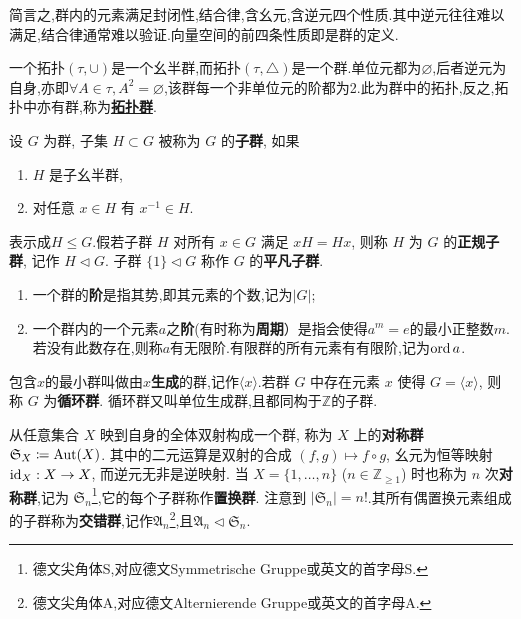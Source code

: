 简言之,群内的元素满足封闭性,结合律,含幺元,含逆元四个性质.其中逆元往往难以满足,结合律通常难以验证.向量空间的前四条性质即是群的定义.
\begin{example}
	一个拓扑$(\tau,\cup)$是一个幺半群,而拓扑$(\tau,\triangle)$是一个群.单位元都为$\varnothing$,后者逆元为自身,亦即$\forall A\in\tau,A^2=\varnothing$,该群每一个非单位元的阶都为2.此为群中的拓扑,反之,拓扑中亦有群,称为\href{https://en.wikipedia.org/wiki/Topological_group}{\textbf{拓扑群}}.
\end{example}
\begin{definition}
	设 $G$ 为群, 子集 $H \subset G$ 被称为 $G$ 的\textbf{子群}, 如果
	\begin{enumerate}
		\item $H$ 是子幺半群,
		\item 对任意 $x \in H$ 有 $x^{-1} \in H$.
	\end{enumerate}
	表示成$H\leqslant G$.假若子群 $H$ 对所有 $x \in G$ 满足 $xH = Hx$, 则称 $H$ 为 $G$ 的\textbf{正规子群}, 记作 $H \lhd G$. 子群 $\{1\} \lhd G$ 称作 $G$ 的\textbf{平凡子群}.
\end{definition}
\begin{definition}
	\begin{enumerate}
		\item 一个群的\textbf{阶}是指其势,即其元素的个数,记为$|G|$;
		\item 一个群内的一个元素$a$之\textbf{阶}(有时称为\textbf{周期}）是指会使得$a^m = e$的最小正整数$m$.若没有此数存在,则称$a$有无限阶.有限群的所有元素有有限阶,记为$\operatorname{\mathrm{ord}} a$.
	\end{enumerate}
\end{definition}
\begin{example}\label{eg:cyclic-group}
	包含$x$的最小群叫做由$x$\textbf{生成}的群,记作$\langle x\rangle$.若群 $G$ 中存在元素 $x$ 使得 $G = \langle x\rangle$, 则称 $G$ 为\textbf{循环群}. 循环群又叫单位生成群,且都同构于$\mathbb{Z}$的子群.
\end{example}
\begin{example}\label{eg:symmetric-group}
	从任意集合 $X$ 映到自身的全体双射构成一个群, 称为 $X$ 上的\textbf{对称群} $\mathfrak{S}_X \coloneqq \operatorname{\mathrm{Aut}}(X)$. 其中的二元运算是双射的合成 $(f, g) \mapsto f \circ g$, 幺元为恒等映射 $\operatorname{\mathrm{id}}_X: X \to X$, 而逆元无非是逆映射. 当 $X = \{1, \ldots, n\}$ ($n \in \mathbb{Z}_{\geq 1}$) 时也称为 $n$ 次\textbf{对称群},记为 $\mathfrak{S}_n$\footnote{德文尖角体S,对应德文Symmetrische Gruppe或英文的首字母S.},它的每个子群称作\textbf{置换群}. 注意到 $|\mathfrak{S}_n| = n!$.其所有偶置换元素组成的子群称为\textbf{交错群},记作$\mathfrak{A}_n$\footnote{德文尖角体A,对应德文Alternierende Gruppe或英文的首字母A.},且$\mathfrak{A}_n\lhd \mathfrak{S}_n$.
\end{example}
